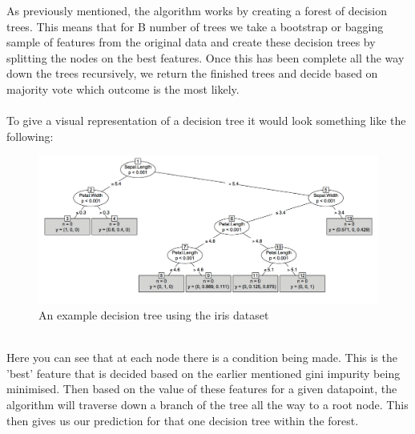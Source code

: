 As previously mentioned, the algorithm works by creating a forest of decision trees. This means that for B number of trees we take a bootstrap or bagging sample of features from the original data and create these decision trees by splitting the nodes on the best features. Once this has been complete all the way down the trees recursively, we return the finished trees and decide based on majority vote which outcome is the most likely. 
\\
\\
\clearpage
To give a visual representation of a decision tree it would look something like the following:
\begin{figure}[h]
	\includegraphics[width=150mm]{figures/tree}
	\caption{An example decision tree using the iris dataset}
\end{figure}
\\
Here you can see that at each node there is a condition being made. This is the 'best' feature that is decided based on the earlier mentioned gini impurity being minimised. Then based on the value of these features for a given datapoint, the algorithm will traverse down a branch of the tree all the way to a root node. This then gives us our prediction for that one decision tree within the forest. 

